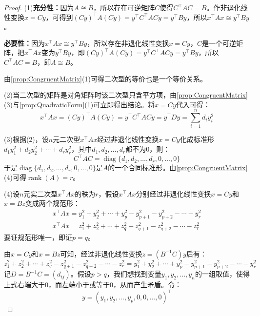 \begin{proof}
	(1)\textbf{充分性：}因为$A\cong B$，所以存在可逆矩阵$C$使得$C^{\top}AC=B$。作非退化线性变换$x=Cy$，可得到$(Cy)^{\top}A(Cy)=y^{\top}C^{\top}ACy=y^{\top}By$，所以$x^{\top}Ax\cong y^{\top}By$。\par
	\textbf{必要性：}因为$x^{\top}Ax\cong y^{\top}By$，所以存在非退化线性变换$x=Cy$，$C$是一个可逆矩阵，把$x^{\top}Ax$变为$y^{\top}By$，即$(Cy)^{\top}A(Cy)=y^{\top}C^{\top}ACy=y^{\top}By$，所以$C^{\top}AC=B$，即$A\cong B$。\par
	由\cref{prop:CongruentMatrix}(1)可得二次型的等价也是一个等价关系。\par
	(2)当二次型的矩阵是对角矩阵时该二次型只含平方项，由\cref{prop:CongruentMatrix}(3)与\cref{prop:QuadraticForm}(1)可立即得出结论。将$x=Cy$代入可得：
	\begin{equation*}
		x^{\top}Ax=(Cy)^{\top}A(Cy)=y^{\top}C^{\top}ACy=y^{\top}Dy=\sum_{i=1}^{n}d_iy_i^2
	\end{equation*}\par
	(3)根据(2)，设$n$元二次型$x^{\top}Ax$经过非退化线性变换$x=Cy$化成标准形$d_1y_1^2+d_2y_2^2+\cdots+d_ry_r^2$，其中$d_1,d_2,\dots,d_r$都不为$0$，则：
	\begin{equation*}
		C^{\top}AC=\operatorname{diag}\{d_1,d_2,\dots,d_r,0,\dots,0\}
	\end{equation*}
	于是$\operatorname{diag}\{d_1,d_2,\dots,d_r,0,\dots,0\}$是$A$的一个合同标准形。由\cref{prop:CongruentMatrix}(4)可得$\operatorname{rank}(A)=r$。\par
	(4)设$n$元实二次型$x^{\top}Ax$的秩为$r$，假设$x^{\top}Ax$分别经过非退化线性变换$x=Cy$和$x=Bz$变成两个规范形：
	\begin{gather*}
		x^{\top}Ax=y_1^2+y_2^2+\cdots+y_p^2-y_{p+1}^2-y_{p+2}^2-\cdots-y_r^2 \\
		x^{\top}Ax=z_1^2+z_2^2+\cdots+z_q^2-z_{q+1}^2-z_{q+2}^2-\cdots-z_r^2
	\end{gather*}
	要证规范形唯一，即证$p=q$。\par
	由$x=Cy$和$x=Bz$可知，经过非退化线性变换$z=(B^{-1}C)y$后有：
	\begin{equation*}
		z_1^2+z_2^2+\cdots+z_q^2-z_{q+1}^2-z_{q+2}^2-\cdots-z_r^2
		=y_1^2+y_2^2+\cdots+y_p^2-y_{p+1}^2-y_{p+2}^2-\cdots-y_r^2
	\end{equation*}
	记$D=B^{-1}C=(d_{ij})$。假设$p>q$，我们想找到变量$y_1,y_2,\dots,y_n$的一组取值，使得上式右端大于$0$，而左端小于或等于$0$，从而产生矛盾。令：
	\begin{equation*}
		y=(y_1,y_2,\dots,y_p,0,0,\dots,0)^{\top}
	\end{equation*}

\end{proof}
